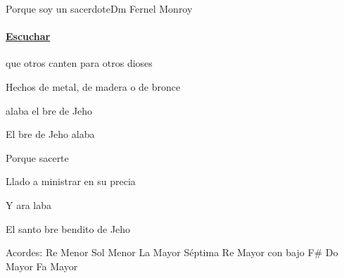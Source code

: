 \documentclass[12pt, spanish]{book}
\begin{document}
    \begin{song}{Porque soy un sacerdote}{Dm}
    {} %
    {Fernel Monroy}
    {} %
    {}
        \ifChordBk
        \paragraph{\mbox{}\hfill\protect\href{https://open.spotify.com/intl-es/track/3xpDb9bxKzw299S8tDrGRT}{Escuchar}\mbox{}\hfill}
        \fi


        \begin{SBOpGroup}
            que otros canten para otros dioses

            Hechos de metal, de madera o de bronce

             alaba el bre de Jeho

            El bre de Jeho alaba
        \end{SBOpGroup}

        \begin{SBChorus}
            Porque   sacerte

            Llado a ministrar en su precia

            Y ara laba

            El santo bre bendito de Jeho
        \end{SBChorus}

        \ifChordBk
        \begin{SBOpGroup}
            Acordes:\break
            \upchord{\Dm}\qquad Re Menor \hfill
            \upchord{\Gm}\qquad Sol Menor \hfill\null\break
            \upchord{\Aseven}\qquad La Mayor S\'eptima \hfill\null\break
            \upchord{\DFs}\qquad Re Mayor con bajo F\# \hfill
            \upchord{\C}\qquad Do Mayor \hfill\null\break
            \upchord{\F}\qquad Fa Mayor \hfill\null\break
        \end{SBOpGroup}
        \fi
    \end{song}
\end{document}
